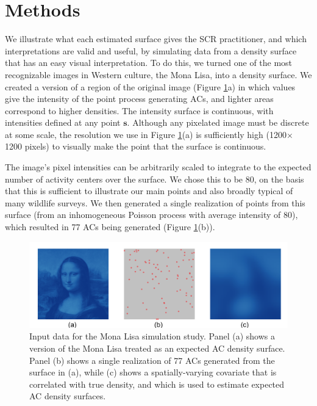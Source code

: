 \documentclass[useAMS,usenatbib,referee]{biom}
\begin{document}
\section{Methods}

We illustrate what each estimated surface gives the SCR practitioner, and which interpretations are valid and useful, by simulating data from a density surface that has an easy visual interpretation. To do this, we turned one of the most recognizable images in Western culture, the Mona Lisa, into a density surface. We created a version of a region of the original image (Figure \ref{mlinputs}a) in which values give the intensity of the point process generating ACs, and lighter areas correspond to higher densities. The intensity surface is continuous, with intensities defined at any point $\bm{s}$. Although any pixelated image must be discrete at some scale, the resolution we use in Figure \ref{mlinputs}(a) is sufficiently high (1200$\times$ 1200 pixels) to visually make the point that the surface is continuous.  

The image's pixel intensities can be arbitrarily scaled to integrate to the expected number of activity centers over the surface. We chose this to be 80, on the basis that this is sufficient to illustrate our main points and also broadly typical of many wildlife surveys. We then generated a single realization of points from this surface (from an inhomogeneous Poisson process with average intensity of 80), which resulted in 77 ACs being generated (Figure \ref{mlinputs}(b)).

\begin{figure}[htbp]
\centering
\includegraphics[width=1\textwidth]{mona_inputdata.png}
\caption{Input data for the Mona Lisa simulation study. Panel (a) shows a version of the Mona Lisa treated as an expected AC density surface. Panel (b) shows a single realization of 77 ACs generated from the surface in (a), while (c) shows a spatially-varying covariate that is correlated with true density, and which is used to estimate expected AC density surfaces.}
\label{mlinputs}
\end{figure}
\end{document}
